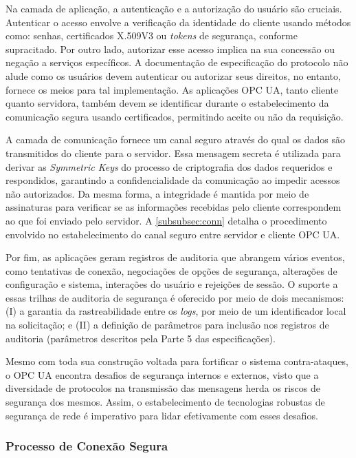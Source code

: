         Na camada de aplicação, a autenticação e a autorização do usuário são cruciais. Autenticar o acesso envolve a verificação da identidade do cliente usando métodos como: senhas, certificados X.509V3 ou \textit{tokens} de segurança, conforme supracitado. Por outro lado, autorizar esse acesso implica na sua concessão ou negação a serviços específicos. A documentação de especificação do protocolo não alude como os usuários devem autenticar ou autorizar seus direitos, no entanto, fornece os meios para tal implementação. As aplicações OPC UA, tanto cliente quanto servidora, também devem se identificar durante o estabelecimento da comunicação segura usando certificados, permitindo aceite ou não da requisição.
        
        A camada de comunicação fornece um canal seguro através do qual os dados são transmitidos do cliente para o servidor. Essa mensagem secreta é utilizada para derivar as \textit{Symmetric Keys} do processo de criptografia dos dados requeridos e respondidos, garantindo a confidencialidade da comunicação ao impedir acessos não autorizados. Da mesma forma, a integridade é mantida por meio de assinaturas para verificar se as informações recebidas pelo cliente correspondem ao que foi enviado pelo servidor. A \autoref{subsubsec:conn} detalha o procedimento envolvido no estabelecimento do canal seguro entre servidor e cliente OPC UA.

        Por fim, as aplicações geram registros de auditoria que abrangem vários eventos, como tentativas de conexão, negociações de opções de segurança, alterações de configuração e sistema, interações do usuário e rejeições de sessão. O suporte a essas trilhas de auditoria de segurança é oferecido por meio de dois mecanismos: (I) a garantia da rastreabilidade entre os \textit{logs}, por meio de um identificador local na solicitação; e (II) a definição de parâmetros para inclusão nos registros de auditoria (parâmetros descritos pela Parte 5 das especificações).

        Mesmo com toda sua construção voltada para fortificar o sistema contra-ataques, o OPC UA encontra desafios de segurança internos e externos, visto que a diversidade de protocolos na transmissão das mensagens herda os riscos de segurança dos mesmos. Assim, o estabelecimento de tecnologias robustas de segurança de rede é imperativo para lidar efetivamente com esses desafios.

        \subsubsection{Processo de Conexão Segura} \label{subsubsec:conn}

